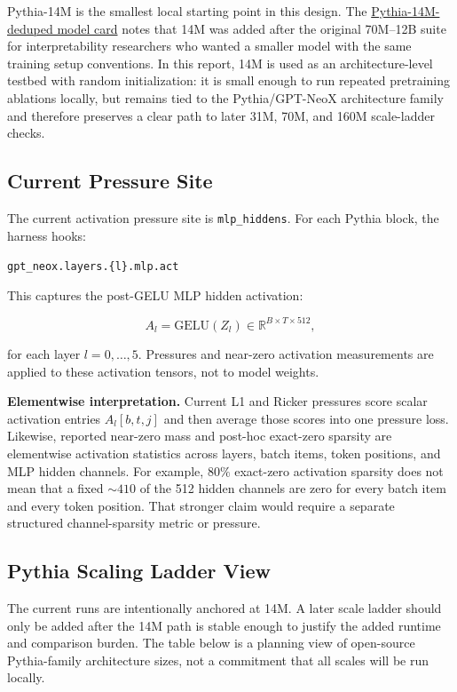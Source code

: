 \documentclass[10pt]{article}
\newcommand{\code}[1]{\texttt{#1}}
\begin{document}
Pythia-14M is the smallest local starting point in this design. The \href{https://huggingface.co/EleutherAI/pythia-14m-deduped}{Pythia-14M-deduped model card} notes that 14M was added after the original 70M--12B suite for interpretability researchers who wanted a smaller model with the same training setup conventions. In this report, 14M is used as an architecture-level testbed with random initialization: it is small enough to run repeated pretraining ablations locally, but remains tied to the Pythia/GPT-NeoX architecture family and therefore preserves a clear path to later 31M, 70M, and 160M scale-ladder checks.

\subsection*{Current Pressure Site}

The current activation pressure site is \code{mlp\_hiddens}. For each Pythia block, the harness hooks:

\begin{center}
\code{gpt\_neox.layers.\{l\}.mlp.act}
\end{center}

This captures the post-GELU MLP hidden activation:

\[
A_l = \mathrm{GELU}(Z_l) \in \mathbb{R}^{B \times T \times 512},
\]

for each layer $l=0,\ldots,5$. Pressures and near-zero activation measurements are applied to these activation tensors, not to model weights.

\textbf{Elementwise interpretation.} Current L1 and Ricker pressures score scalar activation entries $A_l[b,t,j]$ and then average those scores into one pressure loss. Likewise, reported near-zero mass and post-hoc exact-zero sparsity are elementwise activation statistics across layers, batch items, token positions, and MLP hidden channels. For example, $80\%$ exact-zero activation sparsity does not mean that a fixed $\sim 410$ of the 512 hidden channels are zero for every batch item and every token position. That stronger claim would require a separate structured channel-sparsity metric or pressure.

\subsection*{Pythia Scaling Ladder View}

The current runs are intentionally anchored at 14M. A later scale ladder should only be added after the 14M path is stable enough to justify the added runtime and comparison burden. The table below is a planning view of open-source Pythia-family architecture sizes, not a commitment that all scales will be run locally.
\end{document}
